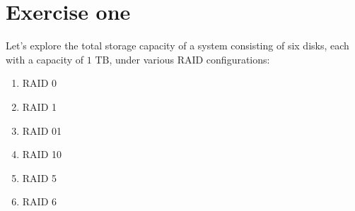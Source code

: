 \section{Exercise one}

Let's explore the total storage capacity of a system consisting of six disks, each with a capacity of $1\text{ TB}$, under various RAID configurations:
\begin{enumerate}
    \item RAID 0
    \item RAID 1
    \item RAID 01
    \item RAID 10
    \item RAID 5
    \item RAID 6
\end{enumerate}

